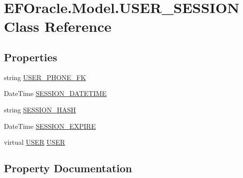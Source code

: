 \hypertarget{class_e_f_oracle_1_1_model_1_1_u_s_e_r___s_e_s_s_i_o_n}{}\section{E\+F\+Oracle.\+Model.\+U\+S\+E\+R\+\_\+\+S\+E\+S\+S\+I\+ON Class Reference}
\label{class_e_f_oracle_1_1_model_1_1_u_s_e_r___s_e_s_s_i_o_n}
\subsection*{Properties}
\begin{DoxyCompactItemize}
\item 
string \hyperlink{class_e_f_oracle_1_1_model_1_1_u_s_e_r___s_e_s_s_i_o_n_a68959ea6dd53308cc7f49027d86d4fd2}{U\+S\+E\+R\+\_\+\+P\+H\+O\+N\+E\+\_\+\+FK}
\item 
Date\+Time \hyperlink{class_e_f_oracle_1_1_model_1_1_u_s_e_r___s_e_s_s_i_o_n_a234044b2c332bf682dbdf1f58179a493}{S\+E\+S\+S\+I\+O\+N\+\_\+\+D\+A\+T\+E\+T\+I\+ME}
\item 
string \hyperlink{class_e_f_oracle_1_1_model_1_1_u_s_e_r___s_e_s_s_i_o_n_ac59ad604d706879163681a09421eea95}{S\+E\+S\+S\+I\+O\+N\+\_\+\+H\+A\+SH}
\item 
Date\+Time \hyperlink{class_e_f_oracle_1_1_model_1_1_u_s_e_r___s_e_s_s_i_o_n_a5a7becbb18a66d1c457335e36ee7fd94}{S\+E\+S\+S\+I\+O\+N\+\_\+\+E\+X\+P\+I\+RE}
\item 
virtual \hyperlink{class_e_f_oracle_1_1_model_1_1_u_s_e_r}{U\+S\+ER} \hyperlink{class_e_f_oracle_1_1_model_1_1_u_s_e_r___s_e_s_s_i_o_n_acf0791e197b026b18713de020c3ce7e1}{U\+S\+ER}
\end{DoxyCompactItemize}


\subsection{Property Documentation}
\mbox{\label{class_e_f_oracle_1_1_model_1_1_u_s_e_r___s_e_s_s_i_o_n_a234044b2c332bf682dbdf1f58179a493}} 
